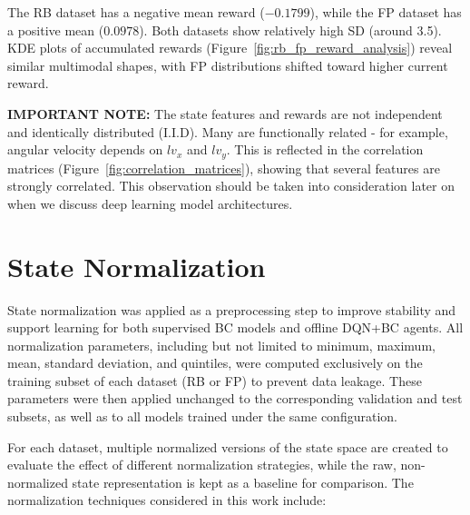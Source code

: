 The RB dataset has a negative mean reward ($-0.1799$), while the FP dataset has a positive mean ($0.0978$). Both datasets show relatively high SD (around 3.5). KDE plots of accumulated rewards (Figure~\ref{fig:rb_fp_reward_analysis}) reveal similar multimodal shapes, with FP distributions shifted toward higher current reward.










\noindent
\begin{minipage}{\textwidth}
\textbf{IMPORTANT NOTE:} The state features and rewards are not independent and identically distributed (I.I.D). Many are functionally related - for example, angular velocity depends on $lv_x$ and $lv_y$. This is reflected in the correlation matrices (Figure~\ref{fig:correlation_matrices}), showing that several features are strongly correlated. This observation should be taken into consideration later on when we discuss deep learning model architectures.
\end{minipage}











\section{State Normalization}
State normalization was applied as a preprocessing step to improve stability and support learning for both supervised BC models and offline DQN+BC agents. All normalization parameters, including but not limited to minimum, maximum, mean, standard deviation, and quintiles, were computed exclusively on the training subset of each dataset (RB or FP) to prevent data leakage. These parameters were then applied unchanged to the corresponding validation and test subsets, as well as to all models trained under the same configuration.

For each dataset, multiple normalized versions of the state space are created to evaluate the effect of different normalization strategies, while the raw, non-normalized state representation is kept as a baseline for comparison. The normalization techniques considered in this work include:

